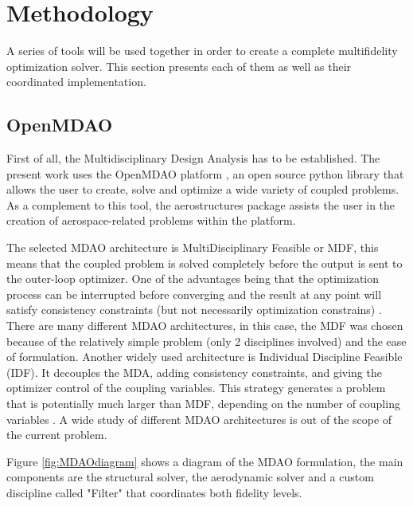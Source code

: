 \documentclass[conf]{new-aiaa}
\begin{document}
\section{Methodology}
\label{sec:methodology}
A series of tools will be used together in order to create a complete multifidelity optimization solver. This section presents each of them as well as their coordinated implementation. 

\subsection{OpenMDAO}
First of all, the Multidisciplinary Design Analysis has to be established. The present work uses the OpenMDAO platform \cite{openmdao_2019}, an open source python library that allows the user to create, solve and optimize a wide variety of coupled problems. As a complement to this tool, the aerostructures package \cite{mascolomer:tel-02023612} assists the user in the creation of aerospace-related problems within the platform. \par The selected MDAO architecture is MultiDisciplinary Feasible or MDF, this means that the coupled problem is solved completely before the output is sent to the outer-loop optimizer. One of the advantages being that the optimization process can be interrupted before converging and the result at any point will satisfy consistency constraints (but not necessarily optimization constrains) \cite{gray2013standard}. There are many different MDAO architectures, in this case, the MDF was chosen because of the relatively simple problem (only 2 disciplines involved) and the ease of formulation. Another widely used architecture is Individual Discipline Feasible (IDF). It decouples the MDA, adding consistency constraints, and giving the optimizer control  of the coupling variables. This strategy generates a problem that is potentially much larger than MDF, depending on the number of coupling variables \cite{gray2013standard}. A wide study of different MDAO architectures is out of the scope of the current problem. \par
Figure \ref{fig:MDAOdiagram} shows a diagram of the MDAO formulation, the main components are the structural solver, the aerodynamic solver and a custom discipline called "Filter" that coordinates both fidelity levels. 
\end{document}
